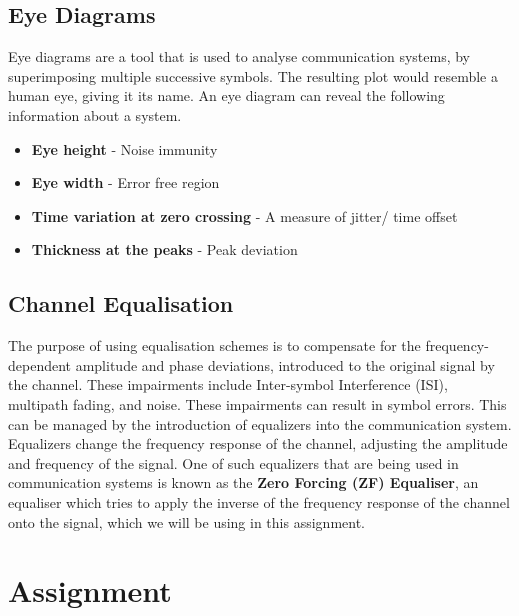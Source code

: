 \documentclass{article}
\begin{document}
        \subsection{Eye Diagrams}
        Eye diagrams are a tool that is used to analyse communication systems, by superimposing multiple successive symbols. The resulting plot would resemble a human eye, giving it its name. An eye diagram can reveal the following information about a system.\cite{onsemi}
        \begin{itemize}
            \item \textbf{Eye height} - Noise immunity
            \item \textbf{Eye width} - Error free region
            \item \textbf{Time variation at zero crossing} - A measure of jitter/ time offset
            \item \textbf{Thickness at the peaks} - Peak deviation
        \end{itemize}

        \subsection{Channel Equalisation}
        The purpose of using equalisation schemes is to compensate for the frequency-dependent amplitude and phase deviations, introduced to the original signal by the channel. These impairments include Inter-symbol Interference (ISI), multipath fading, and noise. These impairments can result in symbol errors. This can be managed by the introduction of equalizers into the communication system.\\

        Equalizers change the frequency response of the channel, adjusting the amplitude and frequency of the signal. One of such equalizers that are being used in communication systems is known as the \textbf{Zero Forcing (ZF) Equaliser}, an equaliser which tries to apply the inverse of the frequency response of the channel onto the signal, which we will be using in this assignment.

        \section{Assignment}
\end{document}
